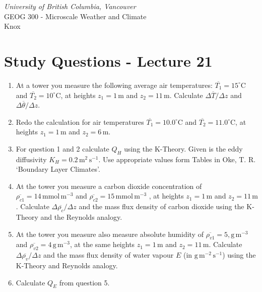 \documentclass[11pt]{article}
\author{Andy Black and Andreas Christen}
\begin{document}
\begin{center}
\emph{University of British Columbia, Vancouver}\\
GEOG 300 - Microscale Weather and Climate\\
Knox
\section*{Study Questions - Lecture 21}
\end{center}

\begin{enumerate}

\item At a tower you measure the following average air temperatures: $\overline{T_1} = 15^{\circ}\textrm{C}$ and $\overline{T_2} = 10^{\circ}\textrm{C}$, at heights $z_1 = 1\,\textrm{m}$ and $z_2 = 11\,\textrm{m}$. Calculate $\Delta \overline{T} / \Delta z$ and  $\Delta \overline{\theta} / \Delta z$.

\item Redo the calculation for air temperatures $\overline{T_1} = 10.0^{\circ}\textrm{C}$ and $\overline{T_2} = 11.0^{\circ}\textrm{C}$, at heights $z_1 = 1\,\textrm{m}$ and $z_2 = 6\,\textrm{m}$.

\item For question 1 and 2 calculate $Q_H$ using the K-Theory. Given is the eddy diffusivity $K_H = 0.2\,\textrm{m}^{2}\,\textrm{s}^{-1}$. Use appropriate values form Tables in Oke, T. R. `Boundary Layer Climates'.

\item At the tower you measure a carbon dioxide concentration of $\overline{\rho_{c1}} = 14\,\textrm{mmol}\,\textrm{m}^{-3}$ and $\overline{\rho_{c2}} = 15\,\textrm{mmol}\,\textrm{m}^{-3}$ , at heights $z_1 = 1\,\textrm{m}$ and $z_2 = 11\,\textrm{m}$. Calculate $\Delta \overline{\rho_{c}} / \Delta z$ and the mass flux density of carbon dioxide using the K-Theory and the Reynolds analogy.

\item At the tower you measure also measure absolute humidity of $\overline{\rho_{v1}} = 5,\textrm{g}\,\textrm{m}^{-3}$ and $\overline{\rho_{v2}} = 4\,\textrm{g}\,\textrm{m}^{-3}$, at the same heights $z_1 = 1\,\textrm{m}$ and $z_2 = 11\,\textrm{m}$. Calculate $\Delta \overline{\rho_{v}} / \Delta z$ and the mass flux density of water vapour $E$ (in $\textrm{g}\,\textrm{m}^{-2}\,\textrm{s}^{-1}$) using the K-Theory and Reynolds analogy.

\item Calculate $Q_E$ from question 5.

\end{enumerate}

\noindent
\end{document}
